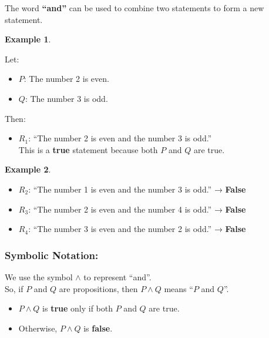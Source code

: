 \documentclass[
]{book}
\providecommand{\tightlist}{%
  \setlength{\itemsep}{0pt}\setlength{\parskip}{0pt}}
\theoremstyle{definition}
\theoremstyle{definition}
\newtheorem{example}{Example}[chapter]
\theoremstyle{definition}
\theoremstyle{definition}
\theoremstyle{remark}
\begin{document}
The word \textbf{``and''} can be used to combine two statements to form a new statement.

\begin{example}
\protect\hypertarget{exm:unnamed-chunk-16}{}\label{exm:unnamed-chunk-16}

Let:

\begin{itemize}
\tightlist
\item
  \(P\): The number 2 is even.
\item
  \(Q\): The number 3 is odd.
\end{itemize}

Then:

\begin{itemize}
\tightlist
\item
  \(R_1\): ``The number 2 is even and the number 3 is odd.''\\
  This is a \textbf{true} statement because both \(P\) and \(Q\) are true.
\end{itemize}

\end{example}

\begin{example}
\protect\hypertarget{exm:unnamed-chunk-17}{}\label{exm:unnamed-chunk-17}\leavevmode

\begin{itemize}
\tightlist
\item
  \(R_2\): ``The number 1 is even and the number 3 is odd.'' → \textbf{False}
\item
  \(R_3\): ``The number 2 is even and the number 4 is odd.'' → \textbf{False}
\item
  \(R_4\): ``The number 3 is even and the number 2 is odd.'' → \textbf{False}
\end{itemize}

\end{example}

\subsubsection{Symbolic Notation:}\label{symbolic-notation}

We use the symbol \(\land\) to represent ``and''.\\
So, if \(P\) and \(Q\) are propositions, then \(P \land Q\) means ``\(P\) and \(Q\)''.

\begin{itemize}
\tightlist
\item
  \(P \land Q\) is \textbf{true} only if both \(P\) and \(Q\) are true.
\item
  Otherwise, \(P \land Q\) is \textbf{false}.
\end{itemize}
\end{document}
